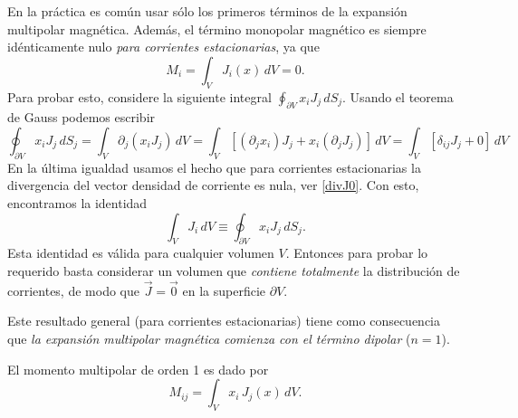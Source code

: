 En la práctica es común usar sólo los primeros términos de la expansión
multipolar magnética. Además, el término monopolar magnético es siempre
idénticamente nulo \textit{para corrientes estacionarias}, ya que
\begin{equation}
 M_i=\int_V J_i(x)\,dV=0. \label{mmm0}
\end{equation}
Para probar esto, considere la siguiente integral $\oint_{\partial V}x_i
J_j\,dS_j$. Usando el teorema de Gauss podemos escribir
\begin{equation}
 \oint_{\partial V}x_i
J_j\,dS_j=\int_V\partial_j(x_iJ_j)\,dV=\int_V\left[
(\partial_jx_i)J_j+x_i(\partial_jJ_j)\right]\,dV=\int_V\left[
\delta_{ij}J_j+0\right]\,dV
\end{equation}
En la última igualdad usamos el hecho que para corrientes estacionarias la
divergencia del vector densidad de corriente es nula, ver \eqref{divJ0}. Con esto, encontramos la
identidad
\begin{equation}
  \int_VJ_i\,dV\equiv \oint_{\partial V}x_iJ_j\,dS_j.
\end{equation}
Esta identidad es válida para cualquier volumen $V$. Entonces para probar lo
requerido basta considerar un volumen que \textit{contiene totalmente}
la distribución de corrientes, de modo que $\vec{J}=\vec{0}$ en la superficie
$\partial V$.

Este resultado general (para corrientes estacionarias) tiene como consecuencia
que \textit{la expansión multipolar magnética comienza con el término
dipolar} ($n=1$).

El momento multipolar de orden 1 es dado por
\begin{equation}
 M_{ij}=\int_V x_i\,J_j(x)\,dV.
\end{equation}

